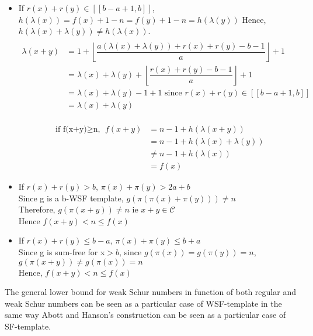 \begin{itemize}
\item If \(r(x)+r(y) \in [\![b-a+1,b]\!]\), \(h(\lambda(x))=f(x)+1-n=f(y)+1-n=h(\lambda(y))\)
Hence, \(h(\lambda(x)+\lambda(y)) \neq h(\lambda(x))\).
\begin{align*}
 \\\lambda(x+y) & =1+\left\lfloor\dfrac{a(\lambda(x)+\lambda(y))+r(x)+r(y)-b-1}{a}\right\rfloor+1\\
& = \lambda(x)+\lambda(y)+\left\lfloor\dfrac{r(x)+r(y)-b-1}{a}\right\rfloor+1 \\
& = \lambda(x)+\lambda(y) -1 +1 \text{ since } r(x)+r(y) \in [\![b-a+1,b]\!] \\
& =\lambda(x)+\lambda(y)
\end{align*}


\begin{align*}
 \\\text{if f(x+y)\(\geqslant\)n, }f(x+y) & =n-1+h(\lambda(x+y))\\
& =n-1+h(\lambda(x)+\lambda(y)) \\
& \neq n-1+h(\lambda(x))\\
& =f(x)
\end{align*}


\item If \(r(x)+r(y)>b\), \(\pi(x)+\pi(y)>2a+b\)
\\Since g is a b-WSF template, \(g(\pi(\pi(x)+\pi(y))) \neq n\)
\\Therefore, \(g(\pi(x+y)) \neq n\) ie \(x+y \in \mathcal{C}\)
\\Hence \(f(x+y) <n\leqslant f(x)\)
\item If \(r(x)+r(y) \leqslant b - a\), \(\pi(x)+\pi(y)\leqslant b+a\)
\\Since g is sum-free for x\(>b\), since \(g(\pi(x)) = g(\pi(y))=n\), \(g(\pi(x+y)) \neq g(\pi(x))=n\)
\\Hence, \(f(x+y) <n\leqslant f(x)\)
\end{itemize}

\begin{corollary}
The general lower bound for weak Schur numbers in function of both regular and weak Schur numbers can be seen as a particular
case of WSF-template in the same way Abott and Hanson's construction can be seen as a particular case of SF-template.
\end{corollary}

